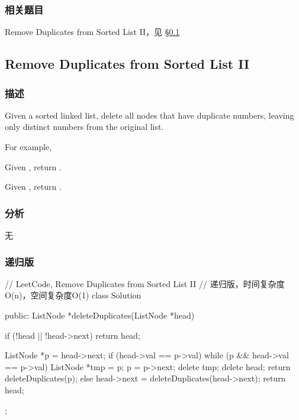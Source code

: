 \subsubsection{相关题目}

\begindot
\item Remove Duplicates from Sorted List II，见 \S \ref{sec:remove-duplicates-from-sorted-list-ii}
\myenddot


\subsection{Remove Duplicates from Sorted List II}
\label{sec:remove-duplicates-from-sorted-list-ii}


\subsubsection{描述}
Given a sorted linked list, delete all nodes that have duplicate numbers, leaving only distinct numbers from the original list.

For example,

Given , return .

Given , return .


\subsubsection{分析}
无


\subsubsection{递归版}
\begin{Code}
// LeetCode, Remove Duplicates from Sorted List II
// 递归版，时间复杂度O(n)，空间复杂度O(1)
class Solution {
public:
    ListNode *deleteDuplicates(ListNode *head) {
        if (!head || !head->next) return head;

        ListNode *p = head->next;
        if (head->val == p->val) {
            while (p && head->val == p->val) {
                ListNode *tmp = p;
                p = p->next;
                delete tmp;
            }
            delete head;
            return deleteDuplicates(p);
        } else {
            head->next = deleteDuplicates(head->next);
            return head;
        }
    }
};
\end{Code}


